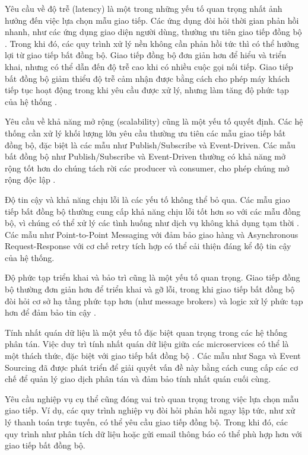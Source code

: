 Yêu cầu về độ trễ (latency) là một trong những yếu tố quan trọng nhất ảnh hưởng đến việc lựa chọn mẫu giao tiếp. Các ứng dụng đòi hỏi thời gian phản hồi nhanh, như các ứng dụng giao diện người dùng, thường ưu tiên giao tiếp đồng bộ \cite{richardson2019}. Trong khi đó, các quy trình xử lý nền không cần phản hồi tức thì có thể hưởng lợi từ giao tiếp bất đồng bộ. Giao tiếp đồng bộ đơn giản hơn để hiểu và triển khai, nhưng có thể dẫn đến độ trễ cao khi có nhiều cuộc gọi nối tiếp. Giao tiếp bất đồng bộ giảm thiểu độ trễ cảm nhận được bằng cách cho phép máy khách tiếp tục hoạt động trong khi yêu cầu được xử lý, nhưng làm tăng độ phức tạp của hệ thống \cite{newman2015}.

Yêu cầu về khả năng mở rộng (scalability) cũng là một yếu tố quyết định. Các hệ thống cần xử lý khối lượng lớn yêu cầu thường ưu tiên các mẫu giao tiếp bất đồng bộ, đặc biệt là các mẫu như Publish/Subscribe và Event-Driven. Các mẫu bất đồng bộ như Publish/Subscribe và Event-Driven thường có khả năng mở rộng tốt hơn do chúng tách rời các producer và consumer, cho phép chúng mở rộng độc lập \cite{aksakalli2021}.

Độ tin cậy và khả năng chịu lỗi là các yếu tố không thể bỏ qua. Các mẫu giao tiếp bất đồng bộ thường cung cấp khả năng chịu lỗi tốt hơn so với các mẫu đồng bộ, vì chúng có thể xử lý các tình huống như dịch vụ không khả dụng tạm thời \cite{fowler2014}. Các mẫu như Point-to-Point Messaging với đảm bảo giao hàng và Asynchronous Request-Response với cơ chế retry tích hợp có thể cải thiện đáng kể độ tin cậy của hệ thống.

Độ phức tạp triển khai và bảo trì cũng là một yếu tố quan trọng. Giao tiếp đồng bộ thường đơn giản hơn để triển khai và gỡ lỗi, trong khi giao tiếp bất đồng bộ đòi hỏi cơ sở hạ tầng phức tạp hơn (như message brokers) và logic xử lý phức tạp hơn để đảm bảo tin cậy \cite{newman2015}.

Tính nhất quán dữ liệu là một yếu tố đặc biệt quan trọng trong các hệ thống phân tán. Việc duy trì tính nhất quán dữ liệu giữa các microservices có thể là một thách thức, đặc biệt với giao tiếp bất đồng bộ \cite{richardson2019}. Các mẫu như Saga và Event Sourcing đã được phát triển để giải quyết vấn đề này bằng cách cung cấp các cơ chế để quản lý giao dịch phân tán và đảm bảo tính nhất quán cuối cùng.

Yêu cầu nghiệp vụ cụ thể cũng đóng vai trò quan trọng trong việc lựa chọn mẫu giao tiếp. Ví dụ, các quy trình nghiệp vụ đòi hỏi phản hồi ngay lập tức, như xử lý thanh toán trực tuyến, có thể yêu cầu giao tiếp đồng bộ. Trong khi đó, các quy trình như phân tích dữ liệu hoặc gửi email thông báo có thể phù hợp hơn với giao tiếp bất đồng bộ.

